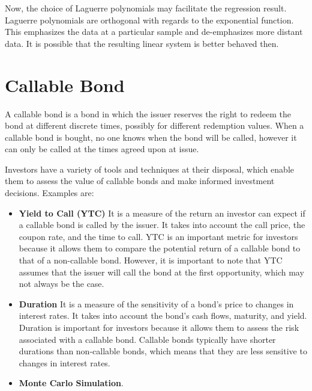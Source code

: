 \documentclass[12pt,a4paper]{book}
\begin{document}
Now, the choice of Laguerre polynomials may facilitate the regression result. Laguerre polynomials are orthogonal with regards to the exponential function. This emphasizes the data at a particular sample and de-emphasizes more distant data. It is possible that the resulting linear system is better behaved then. 

\section{Callable Bond}
A callable bond is a bond in which the issuer reserves the right to redeem the bond at different discrete times, possibly for different redemption values. When a callable bond is bought, no one knows when the bond will be called, however it can only be called at the times agreed upon at issue.

Investors have a variety of tools and techniques at their disposal, which enable them to assess the value of callable bonds and make informed investment decisions. Examples are:
\begin{itemize}
\item \textbf{Yield to Call (YTC)} It is a measure of the return an investor can expect if a callable bond is called by the issuer. It takes into account the call price, the coupon rate, and the time to call. YTC is an important metric for investors because it allows them to compare the potential return of a callable bond to that of a non-callable bond. However, it is important to note that YTC assumes that the issuer will call the bond at the first opportunity, which may not always be the case.
\item \textbf{Duration} It is a measure of the sensitivity of a bond's price to changes in interest rates. It takes into account the bond's cash flows, maturity, and yield. Duration is important for investors because it allows them to assess the risk associated with a callable bond. Callable bonds typically have shorter durations than non-callable bonds, which means that they are less sensitive to changes in interest rates.
\item \textbf{Monte Carlo Simulation}.
\end{itemize}
\end{document}
